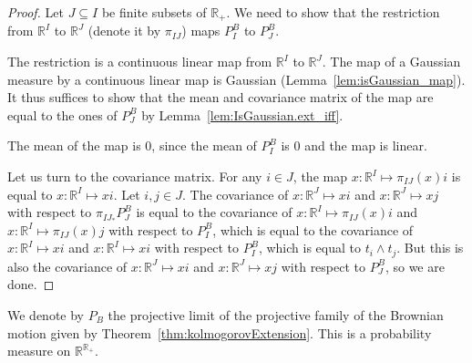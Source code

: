 \begin{proof}\leanok
Let $J \subseteq I$ be finite subsets of $\mathbb{R}_+$.
We need to show that the restriction from $\mathbb{R}^I$ to $\mathbb{R}^J$ (denote it by $\pi_{IJ}$) maps $P^B_I$ to $P^B_J$.

The restriction is a continuous linear map from $\mathbb{R}^I$ to $\mathbb{R}^J$.
The map of a Gaussian measure by a continuous linear map is Gaussian (Lemma~\ref{lem:isGaussian_map}).
It thus suffices to show that the mean and covariance matrix of the map are equal to the ones of $P^B_J$ by Lemma~\ref{lem:IsGaussian.ext_iff}.

The mean of the map is $0$, since the mean of $P^B_I$ is $0$ and the map is linear.

Let us turn to the covariance matrix. For any $i \in J$, the map $x : \mathbb{R}^I \mapsto \pi_{IJ}(x) i$ is equal to $x : \mathbb{R}^I \mapsto x i$. Let $i, j \in J$. The covariance of $x : \mathbb{R}^J \mapsto x i$ and $x : \mathbb{R}^J \mapsto x j$ with respect to $\pi_{IJ}_*P^B_J$ is equal to the covariance of $x : \mathbb{R}^I \mapsto \pi_{IJ}(x) i$ and $x : \mathbb{R}^I \mapsto \pi_{IJ}(x) j$ with respect to $P^B_I$, which is equal to the covariance of $x : \mathbb{R}^I \mapsto x i$ and $x : \mathbb{R}^I \mapsto x i$ with respect to $P^B_I$, which is equal to $t_i \land t_j$. But this is also the covariance of $x : \mathbb{R}^J \mapsto x i$ and $x : \mathbb{R}^J \mapsto x j$ with respect to $P^B_J$, so we are done.
\end{proof}


\begin{definition}\label{def:gaussianLimit}
  \leanok
We denote by $P_B$ the projective limit of the projective family of the Brownian motion given by Theorem~\ref{thm:kolmogorovExtension}.
This is a probability measure on $\mathbb{R}^{\mathbb{R}_+}$.
\end{definition}
